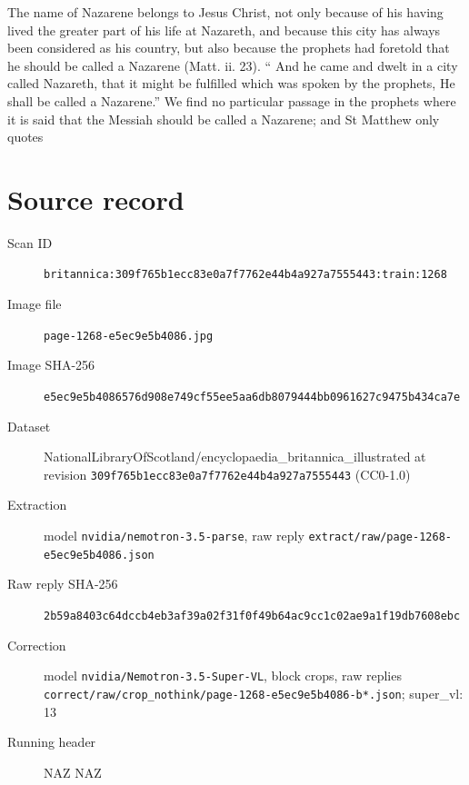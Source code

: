 \documentclass{article}
\begin{document}
The name of Nazarene belongs to Jesus Christ, not only because of his having lived the greater part of his life at Nazareth, and because this city has always been considered as his country, but also because the prophets had foretold that he should be called a Nazarene (Matt. ii. 23). “ And he came and dwelt in a city called Nazareth, that it might be fulfilled which was spoken by the prophets, He shall be called a Nazarene.” We find no particular passage in the prophets where it is said that the Messiah should be called a Nazarene; and St Matthew only quotes


\section*{Source record}
\begin{description}
\item[Scan ID] \texttt{britannica:309f765b1ecc83e0a7f7762e44b4a927a7555443:train:1268}
\item[Image file] \texttt{page-1268-e5ec9e5b4086.jpg}
\item[Image SHA-256] \texttt{e5ec9e5b4086576d908e749cf55ee5aa6db8079444bb0961627c9475b434ca7e}
\item[Dataset] NationalLibraryOfScotland/encyclopaedia\_britannica\_illustrated at revision \texttt{309f765b1ecc83e0a7f7762e44b4a927a7555443} (CC0-1.0)
\item[Extraction] model \texttt{nvidia/nemotron-3.5-parse}, raw reply \texttt{extract/raw/page-1268-e5ec9e5b4086.json}
\item[Raw reply SHA-256] \texttt{2b59a8403c64dccb4eb3af39a02f31f0f49b64ac9cc1c02ae9a1f19db7608ebc}
\item[Correction] model \texttt{nvidia/Nemotron-3.5-Super-VL}, block crops, raw replies \texttt{correct/raw/crop\_nothink/page-1268-e5ec9e5b4086-b*.json}; super\_vl: 13
\item[Running header] NAZ NAZ
\end{description}
\end{document}
